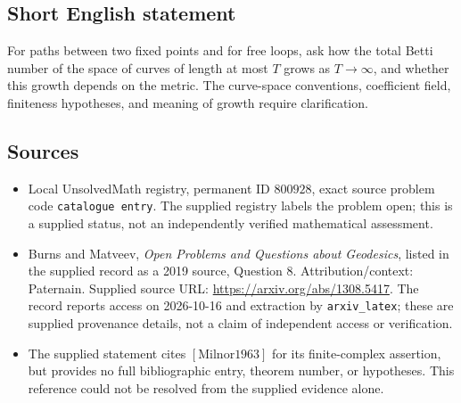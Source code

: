 \documentclass[11pt]{article}
\begin{document}
\subsection{Short English statement}
For paths between two fixed points and for free loops, ask how the total Betti number of the space of curves of length at most \(T\) grows as \(T\to\infty\), and whether this growth depends on the metric. The curve-space conventions, coefficient field, finiteness hypotheses, and meaning of growth require clarification.
\subsection{Sources}
\begin{itemize}
\item Local UnsolvedMath registry, permanent ID \(800928\), exact source problem code \texttt{catalogue entry}. The supplied registry labels the problem open; this is a supplied status, not an independently verified mathematical assessment.
\item Burns and Matveev, \emph{Open Problems and Questions about Geodesics}, listed in the supplied record as a 2019 source, Question 8. Attribution/context: Paternain. Supplied source URL: \url{https://arxiv.org/abs/1308.5417}. The record reports access on 2026-10-16 and extraction by \texttt{arxiv\_latex}; these are supplied provenance details, not a claim of independent access or verification.
\item The supplied statement cites \([\mathrm{Milnor1963}]\) for its finite-complex assertion, but provides no full bibliographic entry, theorem number, or hypotheses. This reference could not be resolved from the supplied evidence alone.
\end{itemize}
\end{document}
